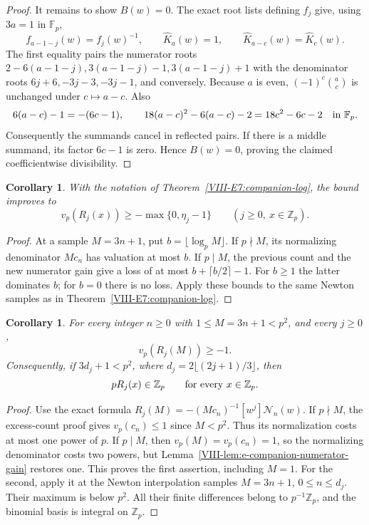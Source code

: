 \documentclass[11pt,letterpaper]{article}
\newtheorem{corollary}[theorem]{Corollary}
\numberwithin{equation}{section}
\begin{document}
\begin{proof}
It remains to show $B(w)=0$. The exact root lists defining $f_j$
give, using $3a=1$ in $\mathbb F_p$,
\[
 f_{a-1-j}(w)=f_j(w)^{-1},\qquad
 \widehat K_a(w)=1,\qquad
 \widehat K_{a-c}(w)=\widehat K_c(w).
\]
The first equality pairs the numerator roots
$2-6(a-1-j),3(a-1-j)-1,3(a-1-j)+1$
with the denominator roots $6j+6,-3j-3,-3j-1$, and conversely.
Because $a$ is even, $(-1)^c\binom ac$ is unchanged under
$c\mapsto a-c$. Also
\[
 6(a-c)-1=-(6c-1),\qquad
 18(a-c)^2-6(a-c)-2=18c^2-6c-2
 \quad\hbox{in }\mathbb F_p.
\]
Consequently the summands cancel in reflected pairs. If there is a
middle summand, its factor $6c-1$ is zero. Hence $B(w)=0$, proving
the claimed coefficientwise divisibility.
\end{proof}

\begin{corollary}\label{VIII-cor:e-companion-improved-log}
With the notation of Theorem~\ref{VIII-E7:companion-log}, the bound improves to
\[
 v_p(R_j(x))\ge-\max\{0,\eta_j-1\}
 \qquad(j\ge0,\ x\in\mathbb Z_p).
\]
\end{corollary}
\begin{proof}
At a sample $M=3n+1$, put $b=\lfloor\log_p M\rfloor$.
If $p\nmid M$, its normalizing denominator $Mc_n$ has valuation
at most $b$. If $p\mid M$, the previous count and the new numerator
gain give a loss of at most $b+\lceil b/2\rceil-1$.
For $b\ge1$ the latter dominates $b$; for $b=0$ there is no loss.
Apply these bounds to the same Newton samples as in
Theorem~\ref{VIII-E7:companion-log}.
\end{proof}

\begin{corollary}\label{VIII-cor:e-companion-short-sample}
For every integer $n\ge0$ with $1\le M=3n+1<p^2$, and every $j\ge0$,
\[
 v_p(R_j(M))\ge-1.
\]
Consequently, if $3d_j+1<p^2$, where
$d_j=2\lfloor(2j+1)/3\rfloor$, then
\[
 pR_j(x)\in\mathbb Z_p\qquad\hbox{for every }x\in\mathbb Z_p.
\]
\end{corollary}
\begin{proof}
Use the exact formula
$R_j(M)=-(Mc_n)^{-1}[w^j]\mathcal N_n(w)$.
If $p\nmid M$, the excess-count proof gives $v_p(c_n)\le1$
since $M<p^2$. Thus its normalization costs at most one power of $p$.
If $p\mid M$, then $v_p(M)=v_p(c_n)=1$, so the normalizing
denominator costs two powers, but
Lemma~\ref{VIII-lem:e-companion-numerator-gain} restores one.
This proves the first assertion, including $M=1$.
For the second, apply it at the Newton interpolation samples
$M=3n+1$, $0\le n\le d_j$. Their maximum is below $p^2$.
All their finite differences belong to $p^{-1}\mathbb Z_p$,
and the binomial basis is integral on $\mathbb Z_p$.
\end{proof}
\end{document}
